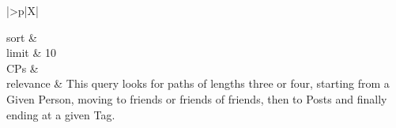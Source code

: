 \begin{tabularx}{\queryCardWidth}{|>{\queryPropertyCell}p{\queryPropertyCellWidth}|X|}
%
	
		sort		&
		\innerCardVSpace \\ \hline
	limit & 10 \\ \hline
	CPs &
	 \\ \hline
	relevance &
		\small This query looks for paths of lengths three or four, starting from a Given Person, moving to friends or friends of
friends, then to Posts and finally ending at a given Tag.
 \\ \hline%
\end{tabularx}
\queryCardVSpace

\renewcommand{\emph}[1]{\oldemph{#1}}